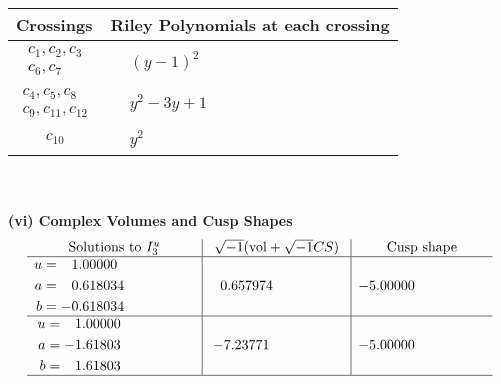 \documentclass[1p]{elsarticle_modified}
\theoremstyle{definition}
\newcommand{\I}{\sqrt{-1}}
\begin{document}
\begin{tabular}{m{50pt}|m{274pt}}
Crossings & \hspace{64pt}Riley Polynomials at each crossing \\
\hline $$\begin{aligned}c_{1},c_{2},c_{3}\\c_{6},c_{7}\end{aligned}$$&$\begin{aligned}
&(y-1)^2
\end{aligned}$\\
\hline $$\begin{aligned}c_{4},c_{5},c_{8}\\c_{9},c_{11},c_{12}\end{aligned}$$&$\begin{aligned}
&y^2-3 y+1
\end{aligned}$\\
\hline $$\begin{aligned}c_{10}\end{aligned}$$&$\begin{aligned}
&y^2
\end{aligned}$\\
\hline
\end{tabular}\\~\\
\newpage\flushleft \textbf{(vi) Complex Volumes and Cusp Shapes}
$$\begin{array}{c|c|c}  
\text{Solutions to }I^u_{3}& \I (\text{vol} + \sqrt{-1}CS) & \text{Cusp shape}\\
 \hline 
\begin{aligned}
u &= \phantom{-}1.00000\phantom{ +0.000000I} \\
a &= \phantom{-}0.618034\phantom{ +0.000000I} \\
b &= -0.618034\phantom{ +0.000000I}\end{aligned}
 & \phantom{-}0.657974\phantom{ +0.000000I} & -5.00000\phantom{ +0.000000I} \\ \hline\begin{aligned}
u &= \phantom{-}1.00000\phantom{ +0.000000I} \\
a &= -1.61803\phantom{ +0.000000I} \\
b &= \phantom{-}1.61803\phantom{ +0.000000I}\end{aligned}
 & -7.23771\phantom{ +0.000000I} & -5.00000\phantom{ +0.000000I}\\
 \hline 
 \end{array}$$\newpage
\newpage\renewcommand{\arraystretch}{1}
\end{document}
